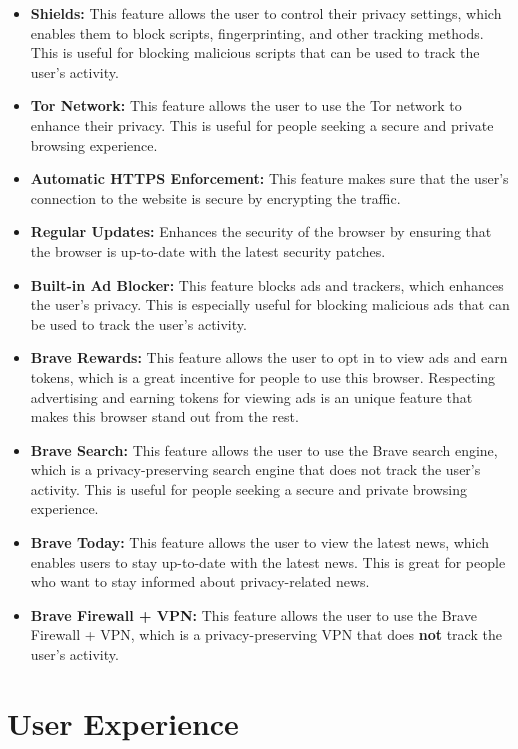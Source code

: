 \documentclass[conference]{IEEEtran}
\begin{document}
\begin{itemize}
    \item \textbf{Shields:} This feature allows the user to control their
    privacy settings, which enables them to block scripts, fingerprinting, and
    other tracking methods. This is useful for blocking malicious scripts that
    can be used to track the user's activity.
    \item \textbf{Tor Network:} This feature allows the user to use the Tor
    network to enhance their privacy. This is useful for people seeking a secure
    and private browsing experience.
    \item \textbf{Automatic HTTPS Enforcement:} This feature makes sure that 
    the user's connection to the website is secure by encrypting the traffic.
    \item \textbf{Regular Updates:} Enhances the security of the browser
    by ensuring that the browser is up-to-date with the latest security patches.
    \item \textbf{Built-in Ad Blocker:} This feature blocks ads and trackers,
    which enhances the user's privacy. This is especially useful for blocking
    malicious ads that can be used to track the user's activity.
    \item \textbf{Brave Rewards:} This feature allows the user to opt in to
    view ads and earn tokens, which is a great incentive for people to use this
    browser. Respecting advertising and earning tokens for viewing ads is an
    unique feature that makes this browser stand out from the rest.
    \item \textbf{Brave Search:} This feature allows the user to use the Brave
    search engine, which is a privacy-preserving search engine that does not
    track the user's activity. This is useful for people seeking a secure and
    private browsing experience.
    \item \textbf{Brave Today:} This feature allows the user to view the latest
    news, which enables users to stay up-to-date with the latest news. This is
    great for people who want to stay informed about privacy-related news.
    \item \textbf{Brave Firewall + VPN:} This feature allows the user to use
    the Brave Firewall + VPN, which is a privacy-preserving VPN that does 
    \textbf{not} track the user's activity.
\end{itemize}

\section{User Experience}
\end{document}
